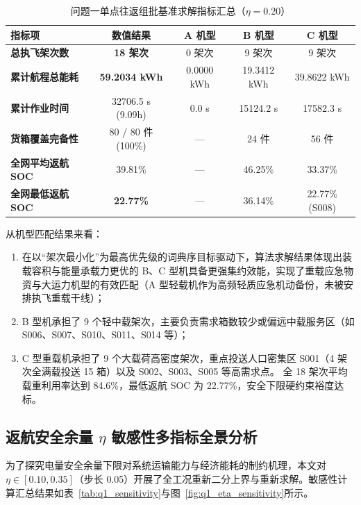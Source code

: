 \begin{table}[htbp]
  \centering
  \caption{问题一单点往返组批基准求解指标汇总（$\eta=0.20$）}
  \label{tab:q1_summary}
  \begin{tabular}{lcccc}
    \toprule
    \textbf{指标项} & \textbf{数值结果} & \textbf{A 机型} & \textbf{B 机型} & \textbf{C 机型} \\
    \midrule
    \textbf{总执飞架次数} & \textbf{18 架次} & 0 架次 & 9 架次 & 9 架次 \\
    \textbf{累计航程总能耗} & \textbf{59.2034 kWh} & 0.0000 kWh & 19.3412 kWh & 39.8622 kWh \\
    \textbf{累计作业时间} & 32706.5 s (9.09h) & 0.0 s & 15124.2 s & 17582.3 s \\
    \textbf{货箱覆盖完备性} & 80 / 80 件 (100\%) & --- & 24 件 & 56 件 \\
    \textbf{全网平均返航 SOC} & 39.81\% & --- & 46.25\% & 33.37\% \\
    \textbf{全网最低返航 SOC} & \textbf{22.77\%} & --- & 36.14\% & 22.77\% (S008) \\
    \bottomrule
  \end{tabular}
\end{table}

从机型匹配结果来看：
\begin{enumerate}
    \item 在以“架次最小化”为最高优先级的词典序目标驱动下，算法求解结果体现出装载容积与能量承载力更优的 B、C 型机具备更强集约效能，实现了重载应急物资与大运力机型的有效匹配（A 型轻载机作为高频轻质应急机动备份，未被安排执飞重载干线）；
    \item B 型机承担了 9 个轻中载架次，主要负责需求箱数较少或偏远中载服务区（如 S006、S007、S010、S011、S014 等）；
    \item C 型重载机承担了 9 个大载荷高密度架次，重点投送人口密集区 S001（4 架次全满载投送 15 箱）以及 S002、S003、S005 等高需求点。
    全 18 架次平均载重利用率达到 84.6\%，最低返航 SOC 为 22.77\%，安全下限硬约束裕度达标。
\end{enumerate}

\subsection{返航安全余量 $\eta$ 敏感性多指标全景分析}

为了探究电量安全余量下限对系统运输能力与经济能耗的制约机理，本文对 $\eta \in [0.10, 0.35]$（步长 0.05）开展了全工况重新二分上界与重新求解。敏感性计算汇总结果如表~\ref{tab:q1_sensitivity}与图~\ref{fig:q1_eta_sensitivity}所示。

